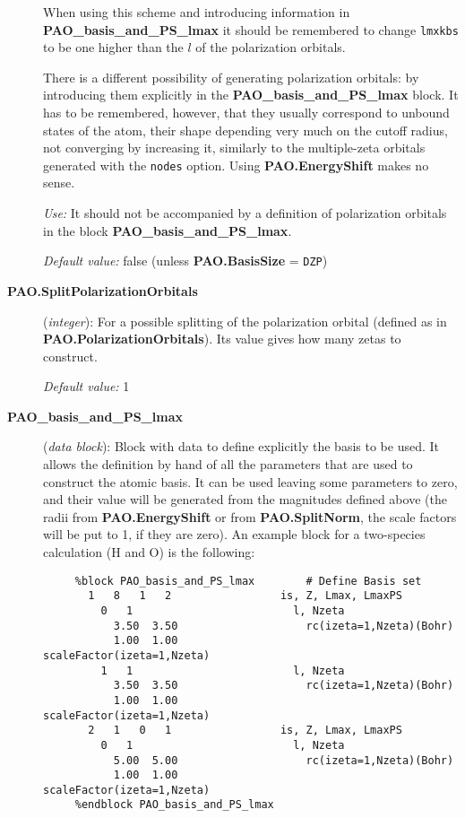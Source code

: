 \begin{description}
When using this scheme and introducing information in 
{\bf PAO\_basis\_and\_PS\_lmax} it should be remembered to change
{\tt lmxkbs} to be one higher than the $l$ of the polarization
orbitals.

There is a different possibility of generating polarization orbitals:
by introducing them explicitly in the {\bf PAO\_basis\_and\_PS\_lmax} block.
It has to be remembered, however, that they usually correspond to 
unbound states of the atom, their shape depending very much on the
cutoff radius, not converging by increasing it, similarly to the
multiple-zeta orbitals generated with the {\tt nodes} option. 
Using {\bf PAO.EnergyShift} makes no sense.

{\it Use:} It should not be accompanied by a definition of polarization
orbitals in the block {\bf PAO\_basis\_and\_PS\_lmax}. 

{\it Default value:} false (unless {\bf PAO.BasisSize} = {\tt DZP})


\item[{\bf PAO.SplitPolarizationOrbitals}] ({\it integer}): 
For a possible splitting of the polarization orbital (defined as
in {\bf PAO.PolarizationOrbitals}). Its value gives how many zetas
to construct.

{\it Default value:} 1


\item[{\bf PAO\_basis\_and\_PS\_lmax}] ({\it data block}): 
Block with data to define explicitly the basis to be used. 
It allows the definition by hand of all the parameters that
are used to construct the atomic basis. It can be used 
leaving some parameters to zero, and their value will be
generated from the magnitudes defined above (the radii from
{\bf PAO.EnergyShift} or from {\bf PAO.SplitNorm}, the scale
factors will be put to 1, if they are zero).
An example block for a two-species calculation (H and O) is the following:
\begin{verbatim}
     %block PAO_basis_and_PS_lmax        # Define Basis set
       1   8   1   2                 is, Z, Lmax, LmaxPS
         0   1                         l, Nzeta
           3.50  3.50                    rc(izeta=1,Nzeta)(Bohr)
           1.00  1.00                    scaleFactor(izeta=1,Nzeta)
         1   1                         l, Nzeta
           3.50  3.50                    rc(izeta=1,Nzeta)(Bohr)
           1.00  1.00                    scaleFactor(izeta=1,Nzeta)
       2   1   0   1                 is, Z, Lmax, LmaxPS
         0   1                         l, Nzeta
           5.00  5.00                    rc(izeta=1,Nzeta)(Bohr)
           1.00  1.00                    scaleFactor(izeta=1,Nzeta)
     %endblock PAO_basis_and_PS_lmax
\end{verbatim}


\end{description}
